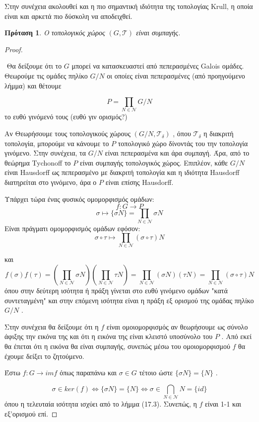 \documentclass[oneside,a4paper]{article}
\newtheorem{prop}{Πρόταση}
\newcommand {\tl}{\textlatin}
\begin{document}
\noindent Στην συνέχεια ακολουθεί και η πιο σημαντική ιδιότητα της τοπολογίας \tl{Krull}, η οποία είναι και αρκετά πιο δύσκολη να αποδειχθεί.
\begin{prop}O τοπολογικός χώρος $(G, \mathcal{T})$ είναι συμπαγής.
\end{prop}
\begin{proof} $ $


$ $\newline
Θα δείξουμε ότι το $G$ μπορεί να κατασκευαστεί από πεπερασμένες Galois ομάδες. Θεωρούμε τις ομάδες πηλίκο $G/N$ οι οποίες είναι πεπερασμένες (από προηγούμενο λήμμα) και θέτουμε

$$P = \prod\limits_{N \in \mathcal{N}} G/N$$
το ευθύ γινόμενό τους (ευθύ γιν ορισμός?)

Αν Θεωρήσουμε τους τοπολογικούς χώρους $(G/N, \mathcal{T}_{\delta})$ , όπου $\mathcal{T}_{\delta}$ η διακριτή τοπολογία, μπορούμε να κάνουμε το $P$ τοπολογικό χώρο δίνοντάς του την τοπολογία γινόμενο. Στην συνέχεια, τα $G/N$ είναι πεπερασμένα και άρα συμπαγή. Άρα, από το θεώρημα Tychonoff το $P$ είναι συμπαγής τοπολογικός χώρος. Επιπλέον, κάθε $G/N$ είναι Hausdorff ως πεπερασμένο με διακριτή τοπολογία και η ιδιότητα Hausdorff διατηρείται στο γινόμενο, άρα ο $P$ είναι επίσης Hausdorff.

Υπάρχει τώρα ένας φυσικός ομομορφισμός ομάδων:
$$f:G \longrightarrow P$$
$$\sigma \longmapsto \{\sigma N \} = \prod\limits_{N \in \mathcal{N}} \sigma N$$
Είναι πράγματι ομομορφισμός ομάδων εφόσον:
$$\sigma \circ \tau \longmapsto \prod\limits_{N \in \mathcal{N}} (\sigma \circ \tau) N$$

και 
$$f(\sigma)f(\tau) = \left( \prod\limits_{N \in \mathcal{N}} \sigma N \right) \left(\prod\limits_{N \in \mathcal{N}}\tau N \right) = \prod\limits_{N \in \mathcal{N}} (\sigma N)(\tau N) = \prod\limits_{N \in \mathcal{N}} (\sigma \circ \tau)N$$
όπου στην δεύτερη ισότητα ή πράξη γίνεται στο ευθύ γινόμενο ομάδων "κατά συντεταγμένη" και στην επόμενη ισότητα είναι η πράξη εξ ορισμού της ομάδας πηλίκο $G/N$ .

Στην συνέχεια θα δείξουμε ότι η $f$ είναι ομοιομορφισμός αν θεωρήσουμε ως σύνολο άφιξης
την εικόνα της και ότι η εικόνα της είναι κλειστό υποσύνολο του $P$ . Από εκεί θα έπεται ότι η εικόνα θα είναι συμπαγής, συνεπώς μέσω του ομοιομορφισμού $f$ θα έχουμε δείξει το ζητούμενο.

Έστω $f: G \rightarrow imf$ όπως παραπάνω και $\sigma \in G$ τέτοιο ώστε $\{\sigma N \} = \{ N\}$ .

$$\sigma \in ker(f) \iff \{\sigma N\} = \{N \} \iff \sigma \in \bigcap_{N \in \mathcal{N}}N = \{id\}$$
όπου η τελευταία ισότητα ισχύει από το λήμμα (17.3). Συνεπώς, η $f$ είναι 1-1 και εξ'ορισμού επί. 


\end{proof}
\end{document}

